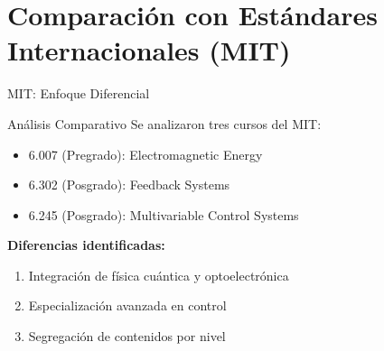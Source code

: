 \documentclass[aspectratio=43]{beamer}
\begin{document}
  \section{Comparación con Estándares Internacionales (MIT)}
  
  \begin{frame}{MIT: Enfoque Diferencial}
  \begin{block}{Análisis Comparativo}
  Se analizaron tres cursos del MIT:
  \begin{itemize}
  \item 6.007 (Pregrado): Electromagnetic Energy
  \item 6.302 (Posgrado): Feedback Systems
  \item 6.245 (Posgrado): Multivariable Control Systems
  \end{itemize}
  \end{block}
  
  \pause
  
  \textbf{Diferencias identificadas:}
  \begin{enumerate}
  \item Integración de física cuántica y optoelectrónica
  \item Especialización avanzada en control
  \item Segregación de contenidos por nivel
  \end{enumerate}
  
  
  \end{frame}
  
\end{document}
